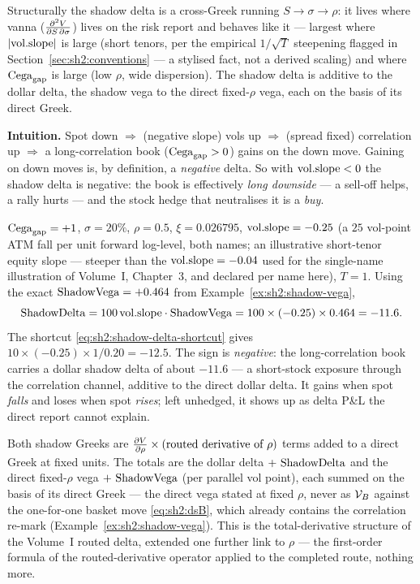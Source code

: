 \begin{remark}\label{rem:sh2:vanna}
Structurally the shadow delta is a cross-Greek running
$S \to \sigma \to \rho$: it lives where vanna
($\frac{\partial^2 V}{\partial S\,\partial \sigma}$) lives on the risk report and behaves like it ---
largest where $\lvert\mathrm{vol.slope}\rvert$ is large (short tenors, per the empirical
$1/\sqrt{T}$ steepening flagged in
Section~\ref{sec:sh2:conventions} --- a stylised fact, not a derived
scaling) and where $\mathrm{Cega}_{\mathrm{gap}}$ is large (low $\rho$, wide dispersion). The shadow delta is additive to the dollar delta, the shadow
vega to the direct fixed-$\rho$ vega, each on the basis of its direct
Greek.
\end{remark}

\textbf{Intuition.} Spot down $\Rightarrow$ (negative slope) vols up
$\Rightarrow$ (spread fixed) correlation up $\Rightarrow$ a
long-correlation book ($\mathrm{Cega}_{\mathrm{gap}} > 0$) gains on the down move. Gaining on down
moves is, by definition, a \emph{negative} delta. So with $\mathrm{vol.slope} < 0$
the shadow delta is negative: the book is effectively \emph{long
downside} --- a sell-off helps, a rally hurts --- and the stock hedge that
neutralises it is a \emph{buy}.

\begin{example}\label{ex:sh2:shadow-delta}
$\mathrm{Cega}_{\mathrm{gap}} = +1$, $\sigma = 20\%$, $\rho = 0.5$, $\xi = 0.026795$,
$\mathrm{vol.slope} = -0.25$ (a $25$ vol-point ATM fall per unit forward log-level,
both names; an illustrative short-tenor equity slope --- steeper than the
$\mathrm{vol.slope} = -0.04$ used for the single-name illustration of Volume~I,
Chapter~3, and declared per name here), $T = 1$. Using the exact
$\mathrm{ShadowVega} = +0.464$ from Example~\ref{ex:sh2:shadow-vega},
\[
  \mathrm{ShadowDelta} = 100\, \mathrm{vol.slope} \cdot \mathrm{ShadowVega}
           = 100 \times (-0.25) \times 0.464 = -11.6 .
\]
The shortcut \eqref{eq:sh2:shadow-delta-shortcut} gives
$10 \times (-0.25) \times 1 / 0.20 = -12.5$. The sign is \emph{negative}:
the long-correlation book carries a dollar shadow delta of about $-11.6$
--- a short-stock exposure through the correlation channel, additive to the
direct dollar delta. It gains when spot \emph{falls} and loses when spot
\emph{rises}; left unhedged, it shows up as delta P\&L the direct report
cannot explain.
\end{example}

\begin{remark}\label{rem:sh2:additive}
Both shadow Greeks are $\frac{\partial V}{\partial \rho} \times (\text{routed derivative of }
\rho)$ terms added to a direct Greek at fixed units. The totals are the
dollar delta $+\ \mathrm{ShadowDelta}$ and the direct fixed-$\rho$ vega $+\ \mathrm{ShadowVega}$
(per parallel vol point), each summed on the basis of its direct Greek
--- the direct vega stated at fixed $\rho$, never as $\mathcal{V}_B$ against the
one-for-one \stickycvc{} basket move \eqref{eq:sh2:dsB}, which already
contains the correlation re-mark (Example~\ref{ex:sh2:shadow-vega}). This is the total-derivative
structure of the Volume~I routed delta, extended one further link to
$\rho$ --- the first-order formula of the routed-derivative operator
applied to the completed route, nothing more.
\end{remark}

